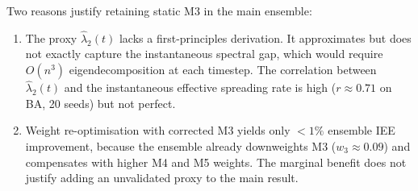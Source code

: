 \documentclass[review,12pt]{elsarticle}
\begin{document}
Two reasons justify retaining static M3 in the main ensemble:
\begin{enumerate}
  \item The proxy $\hat{\lambda}_2(t)$ lacks a first-principles derivation.
        It approximates but does not exactly capture the instantaneous
        spectral gap, which would require $O(n^3)$ eigendecomposition at
        each timestep.  The correlation between $\hat{\lambda}_2(t)$ and
        the instantaneous effective spreading rate is high ($r \approx 0.71$
        on BA, 20 seeds) but not perfect.
  \item Weight re-optimisation with corrected M3 yields only $< 1\%$
        ensemble IEE improvement, because the ensemble already downweights
        M3 ($w_3 \approx 0.09$) and compensates with higher M4 and M5 weights.
        The marginal benefit does not justify adding an unvalidated proxy
        to the main result.
\end{enumerate}



\end{document}
